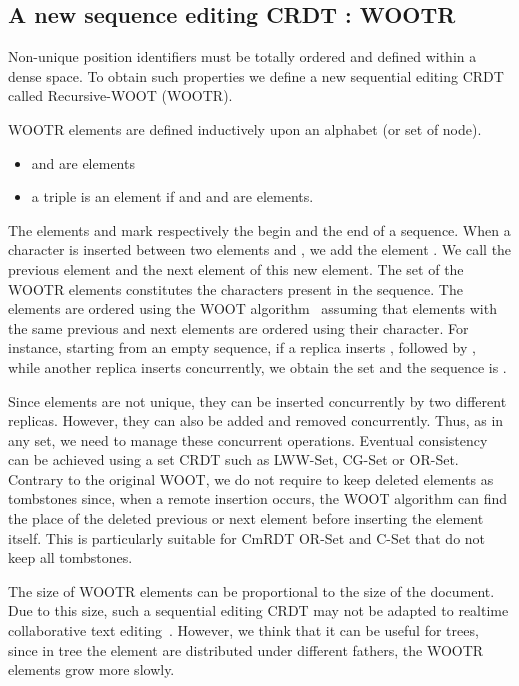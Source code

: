 \documentclass[a4paper]{article}
\begin{document}
\subsection{A new sequence editing CRDT : WOOTR}

Non-unique position identifiers must be totally ordered and defined
within a dense space. To obtain such properties we define a new
sequential editing CRDT called Recursive-WOOT (WOOTR).

WOOTR elements are defined inductively upon an alphabet  (or set
of node).
\begin{itemize}
\item  and  are elements
\item a triple  is an element if 
  and  and  are elements.
\end{itemize}

The elements  and  mark respectively the begin and the
end of a sequence. When a character  is inserted between two
elements  and , we add the element . We
call  the previous element and  the next element of this new
element. The set of the WOOTR elements constitutes the characters
present in the sequence. The elements are ordered using the WOOT
algorithm~\cite{oster06data} assuming that elements with the same
previous and next elements are ordered using their character. For
instance, starting from an empty sequence, if a replica inserts ,
followed by , while another replica inserts  concurrently, we
obtain the set  and the sequence is .

Since elements are not unique, they can be inserted concurrently by
two different replicas. However, they can also be added and removed
concurrently. Thus, as in any set, we need to manage these concurrent
operations. Eventual consistency can be achieved using a set CRDT such
as LWW-Set, CG-Set or OR-Set. Contrary to the original WOOT, we do not
require to keep deleted elements as tombstones since, when a remote
insertion occurs, the WOOT algorithm can find the place of the deleted
previous or next element before inserting the element itself. This is
particularly suitable for CmRDT OR-Set and C-Set that do not keep all
tombstones.

The size of WOOTR elements can be proportional to the size of the
document. Due to this size, such a sequential editing CRDT may not be
adapted to realtime collaborative text
editing~\cite{ahmednacer11evaluating}. However, we think that it can
be useful for trees, since in tree the element are distributed under
different fathers, the WOOTR elements grow more slowly.
\end{document}
